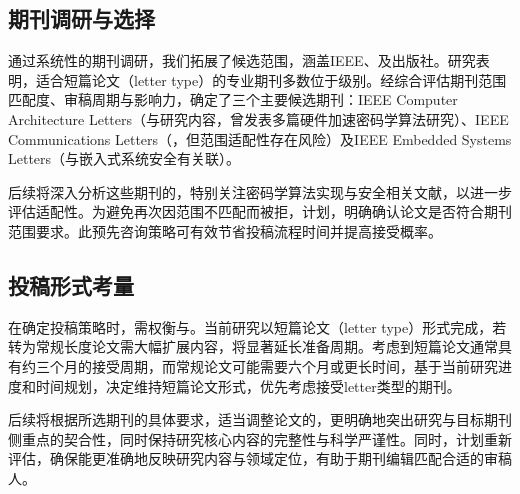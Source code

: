 \documentclass{article}
\begin{document}
\subsection{期刊调研与选择}

通过系统性的期刊调研，我们拓展了候选范围，涵盖IEEE、及出版社。研究表明，适合短篇论文（letter type）的专业期刊多数位于级别。经综合评估期刊范围匹配度、审稿周期与影响力，确定了三个主要候选期刊：IEEE Computer Architecture Letters（与研究内容，曾发表多篇硬件加速密码学算法研究）、IEEE Communications Letters（，但范围适配性存在风险）及IEEE Embedded Systems Letters（与嵌入式系统安全有关联）。

后续将深入分析这些期刊的，特别关注密码学算法实现与安全相关文献，以进一步评估适配性。为避免再次因范围不匹配而被拒，计划，明确确认论文是否符合期刊范围要求。此预先咨询策略可有效节省投稿流程时间并提高接受概率。

\subsection{投稿形式考量}

在确定投稿策略时，需权衡与。当前研究以短篇论文（letter type）形式完成，若转为常规长度论文需大幅扩展内容，将显著延长准备周期。考虑到短篇论文通常具有约三个月的接受周期，而常规论文可能需要六个月或更长时间，基于当前研究进度和时间规划，决定维持短篇论文形式，优先考虑接受letter类型的期刊。

后续将根据所选期刊的具体要求，适当调整论文的，更明确地突出研究与目标期刊侧重点的契合性，同时保持研究核心内容的完整性与科学严谨性。同时，计划重新评估，确保能更准确地反映研究内容与领域定位，有助于期刊编辑匹配合适的审稿人。


\end{document}
